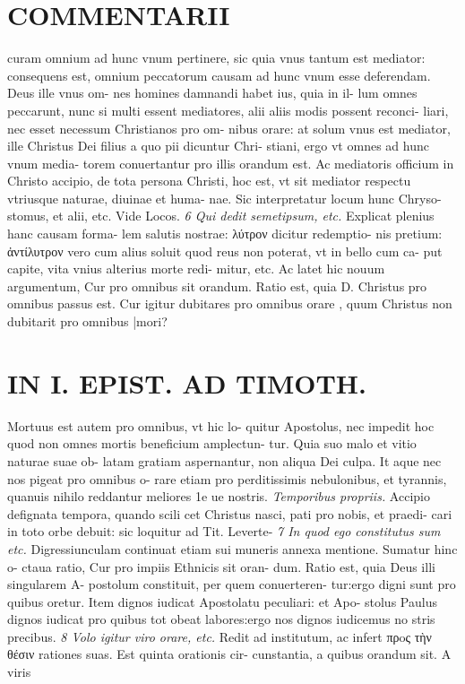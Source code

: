 \documentclass{article}
\begin{document}
\begin{pages}
\section*{COMMENTARII }
\marginpar{[ p.50 ]}\pstart curam omnium ad hunc vnum pertinere, sic quia vnus tantum est mediator: consequens est, omnium peccatorum causam ad hunc vnum esse deferendam. Deus ille vnus om- nes homines damnandi habet ius, quia in il- lum omnes peccarunt, nunc si multi essent mediatores, alii aliis modis possent reconci- liari, nec esset necessum Christianos pro om- nibus orare: at solum vnus est mediator, ille Christus Dei filius a quo pii dicuntur Chri- stiani, ergo vt omnes ad hunc vnum media- torem conuertantur pro illis orandum est. Ac mediatoris officium in Christo accipio, de tota persona Christi, hoc est, vt sit mediator respectu vtriusque naturae, diuinae et huma- nae. Sic interpretatur locum hunc Chryso- stomus, et alii, etc. Vide Locos.  \pend
\textit{6 Qui dedit semetipsum, etc. }\pstart Explicat plenius hanc causam forma- lem salutis nostrae: λύτρον dicitur redemptio- nis pretium: ἀντίλυτρον vero cum alius soluit quod reus non poterat, vt in bello cum ca- put capite, vita vnius alterius morte redi- mitur, etc.  \pend\pstart Ac latet hic nouum argumentum, Cur pro omnibus sit orandum. Ratio est, quia D. Christus pro omnibus passus est. Cur igitur dubitares pro omnibus orare , quum Christus non dubitarit pro omnibus |mori?  \pend
\section*{IN I. EPIST. AD TIMOTH. }
\marginpar{[ p.5 ]}\pstart Mortuus est autem pro omnibus, vt hic lo- quitur Apostolus, nec impedit hoc quod non omnes mortis beneficium amplectun- tur. Quia suo malo et vitio naturae suae ob- latam gratiam aspernantur, non aliqua Dei culpa. It aque nec nos pigeat pro omnibus o- rare etiam pro perditissimis nebulonibus, et tyrannis, quanuis nihilo reddantur meliores 1e ue nostris.  \pend
\textit{Temporibus propriis. }\pstart Accipio defignata tempora, quando scili cet Christus nasci, pati pro nobis, et praedi- cari in toto orbe debuit: sic loquitur ad Tit. Leverte-  \pend
\textit{7 In quod ego constitutus sum etc. }\pstart Digressiunculam continuat etiam sui muneris annexa mentione. Sumatur hinc o- ctaua ratio, Cur pro impiis Ethnicis sit oran- dum. Ratio est, quia Deus illi singularem A- postolum constituit, per quem conuerteren- tur:ergo digni sunt pro quibus oretur. Item dignos iudicat Apostolatu peculiari: et Apo- stolus Paulus dignos iudicat pro quibus tot obeat labores:ergo nos dignos iudicemus no stris precibus.  \pend
\textit{8 Volo igitur viro orare, etc. }\pstart Redit ad institutum, ac infert πρoς τὴν θέσιν rationes suas. Est quinta orationis cir- cunstantia, a quibus orandum sit. A viris  \pend

\end{pages}
\end{document}
